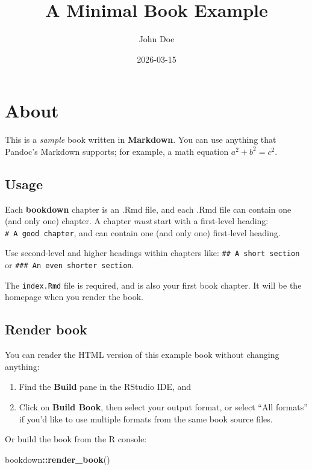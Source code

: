 \documentclass[
]{book}
\title{A Minimal Book Example}
\author{John Doe}
\date{2026-03-15}
\newenvironment{Shaded}{\begin{snugshade}}{\end{snugshade}}
\newcommand{\FunctionTok}[1]{\textcolor[rgb]{0.13,0.29,0.53}{\textbf{#1}}}
\newcommand{\NormalTok}[1]{#1}
\newcommand{\SpecialCharTok}[1]{\textcolor[rgb]{0.81,0.36,0.00}{\textbf{#1}}}
\theoremstyle{definition}
\theoremstyle{definition}
\theoremstyle{definition}
\theoremstyle{definition}
\theoremstyle{remark}
\begin{document}
\maketitle

{
\setcounter{tocdepth}{1}
\tableofcontents
}
\chapter{About}\label{about}

This is a \emph{sample} book written in \textbf{Markdown}. You can use anything that Pandoc's Markdown supports; for example, a math equation \(a^2 + b^2 = c^2\).

\section{Usage}\label{usage}

Each \textbf{bookdown} chapter is an .Rmd file, and each .Rmd file can contain one (and only one) chapter. A chapter \emph{must} start with a first-level heading: \texttt{\#\ A\ good\ chapter}, and can contain one (and only one) first-level heading.

Use second-level and higher headings within chapters like: \texttt{\#\#\ A\ short\ section} or \texttt{\#\#\#\ An\ even\ shorter\ section}.

The \texttt{index.Rmd} file is required, and is also your first book chapter. It will be the homepage when you render the book.

\section{Render book}\label{render-book}

You can render the HTML version of this example book without changing anything:

\begin{enumerate}
\def\labelenumi{\arabic{enumi}.}
\item
  Find the \textbf{Build} pane in the RStudio IDE, and
\item
  Click on \textbf{Build Book}, then select your output format, or select ``All formats'' if you'd like to use multiple formats from the same book source files.
\end{enumerate}

Or build the book from the R console:

\begin{Shaded}
\begin{Highlighting}[]
\NormalTok{bookdown}\SpecialCharTok{::}\FunctionTok{render\_book}\NormalTok{()}
\end{Highlighting}
\end{Shaded}
\end{document}
